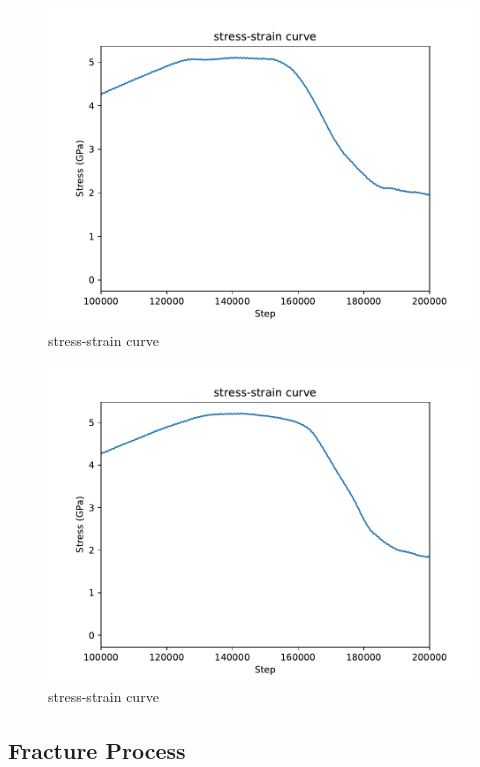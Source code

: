 \documentclass[preview,times]{elsarticle}
\begin{document}
\begin{figure}
	\centering
	\includegraphics[width=1\linewidth]{img/ialine}
	\caption{stress-strain curve}
	\label{fig:ia_line}
\end{figure}

\begin{figure}
	\centering
	\includegraphics[width=1\linewidth]{img/agline}
	\caption{stress-strain curve}
	\label{fig:ag_line}
\end{figure}

\subsection{Fracture Process}
\end{document}
